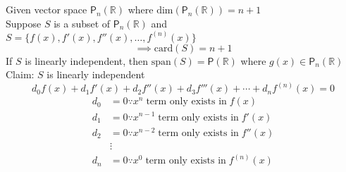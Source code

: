\\\hfill\\
Given vector space $\mathsf{P}_n(\mathbb{R})$ where
$\text{dim}(\mathsf{P}_n(\mathbb{R}))=n +1$\\
Suppose $S$ is a subset of $\mathsf{P}_n(\mathbb{R})$ and $S
=\{f(x),f'(x),f''(x),\dots,f^{(n)}(x)\}$
\begin{equation}
\implies \text{card}(S) = n+1
\end{equation}
If $S$ is linearly independent, then $\text{span}(S) =
\mathsf{P}(\mathbb{R})$ where $g(x) \in \mathsf{P}_n(\mathbb{R})$
\\Claim: $S$ is linearly independent
\begin{equation}
d_0f(x) +d_1f'(x) +d_2f''(x) +d_3f'''(x) + \cdots +d_nf^{(n)}(x) =0
\end{equation}
\begin{align}
d_0 &= 0 \because x^n\;\text{term only exists in}\; f(x)\\
d_1 &= 0 \because x^{n-1}\;\text{term only exists in}\; f'(x)\\
d_2 &= 0 \because x^{n-2}\;\text{term only exists in}\; f''(x)\\
&\vdots\\
d_n &= 0 \because x^0\;\text{term only exists in}\; f^{(n)}(x)
\end{align}
